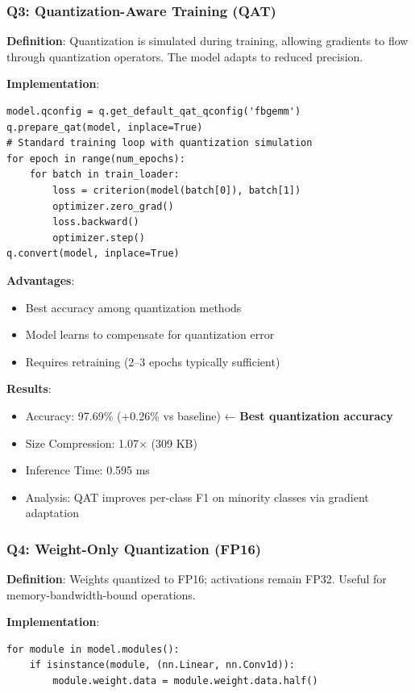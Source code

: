 \documentclass[12pt, a4paper]{article}
\begin{document}
\subsubsection{Q3: Quantization-Aware Training (QAT)}

\textbf{Definition}: Quantization is simulated during training, allowing gradients to flow through quantization operators. The model adapts to reduced precision.

\textbf{Implementation}:
\begin{lstlisting}
model.qconfig = q.get_default_qat_qconfig('fbgemm')
q.prepare_qat(model, inplace=True)
# Standard training loop with quantization simulation
for epoch in range(num_epochs):
    for batch in train_loader:
        loss = criterion(model(batch[0]), batch[1])
        optimizer.zero_grad()
        loss.backward()
        optimizer.step()
q.convert(model, inplace=True)
\end{lstlisting}

\textbf{Advantages}:
\begin{itemize}
    \item Best accuracy among quantization methods
    \item Model learns to compensate for quantization error
    \item Requires retraining (2–3 epochs typically sufficient)
\end{itemize}

\textbf{Results}:
\begin{itemize}
    \item Accuracy: 97.69\% (+0.26\% vs baseline) ← \textbf{Best quantization accuracy}
    \item Size Compression: 1.07× (309 KB)
    \item Inference Time: 0.595 ms
    \item Analysis: QAT improves per-class F1 on minority classes via gradient adaptation
\end{itemize}

\subsubsection{Q4: Weight-Only Quantization (FP16)}

\textbf{Definition}: Weights quantized to FP16; activations remain FP32. Useful for memory-bandwidth-bound operations.

\textbf{Implementation}:
\begin{lstlisting}
for module in model.modules():
    if isinstance(module, (nn.Linear, nn.Conv1d)):
        module.weight.data = module.weight.data.half()
\end{lstlisting}
\end{document}
